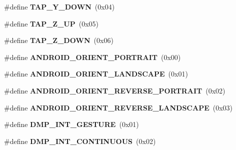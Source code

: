 \begin{DoxyCompactItemize}
\item 
\#define {\bfseries T\+A\+P\+\_\+\+Y\+\_\+\+D\+O\+WN}~(0x04)\hypertarget{group___d_r_i_v_e_r_s_ga3d35b3c219083d14f9fff4a9c65cf783}{}\label{group___d_r_i_v_e_r_s_ga3d35b3c219083d14f9fff4a9c65cf783}

\item 
\#define {\bfseries T\+A\+P\+\_\+\+Z\+\_\+\+UP}~(0x05)\hypertarget{group___d_r_i_v_e_r_s_gab240d8ebc872ea183523f4b3c3f9e346}{}\label{group___d_r_i_v_e_r_s_gab240d8ebc872ea183523f4b3c3f9e346}

\item 
\#define {\bfseries T\+A\+P\+\_\+\+Z\+\_\+\+D\+O\+WN}~(0x06)\hypertarget{group___d_r_i_v_e_r_s_ga8f0f8c5db2a60932cfde68ca0b9c2032}{}\label{group___d_r_i_v_e_r_s_ga8f0f8c5db2a60932cfde68ca0b9c2032}

\item 
\#define {\bfseries A\+N\+D\+R\+O\+I\+D\+\_\+\+O\+R\+I\+E\+N\+T\+\_\+\+P\+O\+R\+T\+R\+A\+IT}~(0x00)\hypertarget{group___d_r_i_v_e_r_s_ga5198482b1487f06b71c9393847ae1897}{}\label{group___d_r_i_v_e_r_s_ga5198482b1487f06b71c9393847ae1897}

\item 
\#define {\bfseries A\+N\+D\+R\+O\+I\+D\+\_\+\+O\+R\+I\+E\+N\+T\+\_\+\+L\+A\+N\+D\+S\+C\+A\+PE}~(0x01)\hypertarget{group___d_r_i_v_e_r_s_ga388a7f6ac0d53cf96318b0bafa5c1c0a}{}\label{group___d_r_i_v_e_r_s_ga388a7f6ac0d53cf96318b0bafa5c1c0a}

\item 
\#define {\bfseries A\+N\+D\+R\+O\+I\+D\+\_\+\+O\+R\+I\+E\+N\+T\+\_\+\+R\+E\+V\+E\+R\+S\+E\+\_\+\+P\+O\+R\+T\+R\+A\+IT}~(0x02)\hypertarget{group___d_r_i_v_e_r_s_ga63b8f82e9d60a84b6fca8c680d78c866}{}\label{group___d_r_i_v_e_r_s_ga63b8f82e9d60a84b6fca8c680d78c866}

\item 
\#define {\bfseries A\+N\+D\+R\+O\+I\+D\+\_\+\+O\+R\+I\+E\+N\+T\+\_\+\+R\+E\+V\+E\+R\+S\+E\+\_\+\+L\+A\+N\+D\+S\+C\+A\+PE}~(0x03)\hypertarget{group___d_r_i_v_e_r_s_ga98dc7e42de72097f62612c758de3ba16}{}\label{group___d_r_i_v_e_r_s_ga98dc7e42de72097f62612c758de3ba16}

\item 
\#define {\bfseries D\+M\+P\+\_\+\+I\+N\+T\+\_\+\+G\+E\+S\+T\+U\+RE}~(0x01)\hypertarget{group___d_r_i_v_e_r_s_gaab5d80253aaee2470c95c6981b731255}{}\label{group___d_r_i_v_e_r_s_gaab5d80253aaee2470c95c6981b731255}

\item 
\#define {\bfseries D\+M\+P\+\_\+\+I\+N\+T\+\_\+\+C\+O\+N\+T\+I\+N\+U\+O\+US}~(0x02)\hypertarget{group___d_r_i_v_e_r_s_gaabccda0e9ccd1a2f4287d23fe4b0c776}{}\label{group___d_r_i_v_e_r_s_gaabccda0e9ccd1a2f4287d23fe4b0c776}


\end{DoxyCompactItemize}
